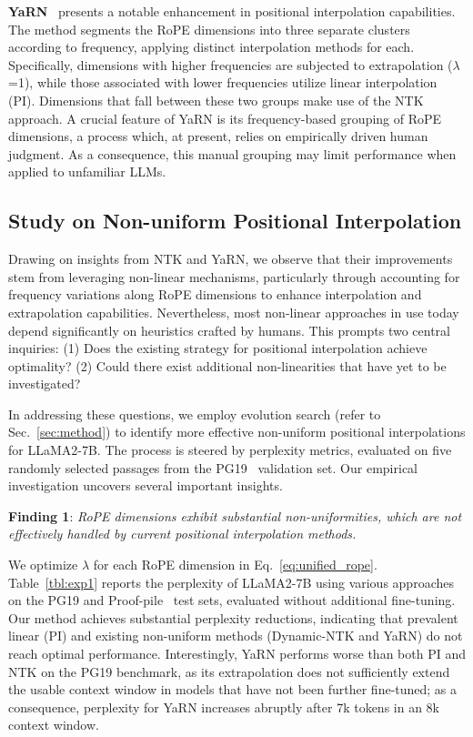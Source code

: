 \textbf{YaRN}~\cite{yarn} presents a notable enhancement in positional interpolation capabilities. The method segments the RoPE dimensions into three separate clusters according to frequency, applying distinct interpolation methods for each. Specifically, dimensions with higher frequencies are subjected to extrapolation ($\lambda$=1), while those associated with lower frequencies utilize linear interpolation (PI). Dimensions that fall between these two groups make use of the NTK approach. A crucial feature of YaRN is its frequency-based grouping of RoPE dimensions, a process which, at present, relies on empirically driven human judgment. As a consequence, this manual grouping may limit performance when applied to unfamiliar LLMs.

\subsection{Study on Non-uniform Positional Interpolation}

Drawing on insights from NTK and YaRN, we observe that their improvements stem from leveraging non-linear mechanisms, particularly through accounting for frequency variations along RoPE dimensions to enhance interpolation and extrapolation capabilities. Nevertheless, most non-linear approaches in use today depend significantly on heuristics crafted by humans. This prompts two central inquiries: (1) Does the existing strategy for positional interpolation achieve optimality? (2) Could there exist additional non-linearities that have yet to be investigated?

In addressing these questions, we employ evolution search (refer to Sec.~\ref{sec:method}) to identify more effective non-uniform positional interpolations for LLaMA2-7B. The process is steered by perplexity metrics, evaluated on five randomly selected passages from the PG19~\cite{pg19} validation set. Our empirical investigation uncovers several important insights.

\textbf{Finding 1}: \textit{RoPE dimensions exhibit substantial non-uniformities, which are not effectively handled by current positional interpolation methods.}

We optimize $\lambda$ for each RoPE dimension in Eq.~\ref{eq:unified_rope}. Table~\ref{tbl:exp1} reports the perplexity of LLaMA2-7B using various approaches on the PG19 and Proof-pile~\cite{proof-pile} test sets, evaluated without additional fine-tuning. Our method achieves substantial perplexity reductions, indicating that prevalent linear (PI) and existing non-uniform methods (Dynamic-NTK and YaRN) do not reach optimal performance. Interestingly, YaRN performs worse than both PI and NTK on the PG19 benchmark, as its extrapolation does not sufficiently extend the usable context window in models that have not been further fine-tuned; as a consequence, perplexity for YaRN increases abruptly after 7k tokens in an 8k context window.

